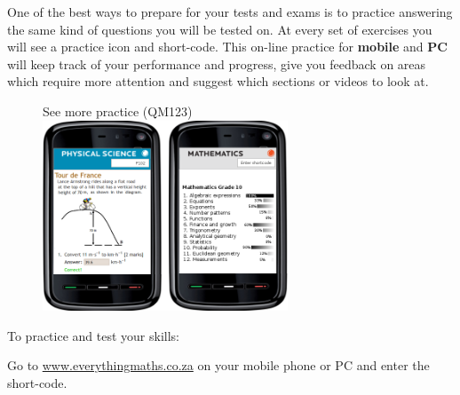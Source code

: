 One of the best ways to prepare for your tests and exams is to practice answering the same kind of
questions you will be tested on. At every set of exercises you will see a practice icon and short-code.
This on-line practice for \textbf{mobile} and \textbf{PC} will keep track of your performance and progress, give you
feedback on areas which require more attention and suggest which sections or videos to look at.

\begin{figure}[h]
\begin{center}

See more practice  (QM123)\vspace{0.2cm}\\ 
\includegraphics[width=0.65\textwidth]{title_images/practicephones.png}
\end{center}
\end{figure}
\par



To practice and test your skills:\par

Go to \underline{www.everythingmaths.co.za} on your mobile phone or PC and enter the short-code.\par

\vspace*{1cm}


%
%


